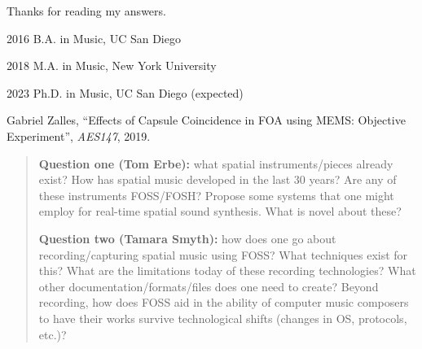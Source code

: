 \documentclass[12pt,chapterheads]{ucsd}
\begin{document}
\begin{frontmatter}
\begin{acknowledgements} 
 Thanks for reading my answers.
\end{acknowledgements}



\begin{vitapage}
\begin{vita}
  \item[2016] B.A. in Music, UC San Diego
  \item[2018] M.A. in Music, New York University
  \item[2023] Ph.D. in Music, UC San Diego (expected)
\end{vita}

\begin{publications}

  \item Gabriel Zalles, ``Effects of Capsule Coincidence in FOA using MEMS: Objective Experiment'', \emph{AES147}, 2019.

\end{publications}

\end{vitapage}



\begin{abstract}

\textbf{Question one (Tom Erbe):} what spatial instruments/pieces already exist? How has spatial music developed in the last 30 years? Are any of these instruments FOSS/FOSH? Propose some systems that one might employ for real-time spatial sound synthesis. What is novel about these?

\par
\vspace{2mm}

\textbf{Question two (Tamara Smyth):} how does one go about recording/capturing spatial music using FOSS? What techniques exist for this? What are the limitations today of these recording technologies? What other documentation/formats/files does one need to create? Beyond recording, how does FOSS aid in the ability of computer music composers to have their works survive technological shifts (changes in OS, protocols, etc.)?  


\end{abstract}
\end{frontmatter}
\end{document}
